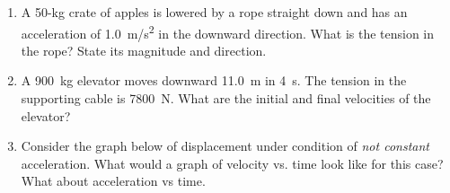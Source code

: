 \begin{enumerate}
\item A 50-kg crate of apples is lowered by a rope straight down and has an acceleration of \SI{1.0}{m/s^2} in the downward direction. What is the tension in the rope? State its magnitude and direction. \bigskip

\item A \SI{900}{kg} elevator moves downward \SI{11.0}{\meter} in \SI{4}{\second}. The tension in the supporting cable is \SI{7800}{\newton}. What are the initial and final velocities of the elevator?
\bigskip



%



%

\item Consider the graph below of displacement under condition of \emph{not constant} acceleration. What would a graph of velocity vs. time look like for this case? What about acceleration vs time. 


\end{enumerate}
